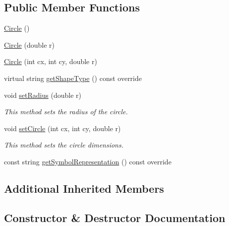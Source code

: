 \subsection*{Public Member Functions}
\begin{DoxyCompactItemize}
\item 
\hyperlink{classbridges_1_1datastructure_1_1_circle_a2106fef85f001fbd2de2d9870a432ef8}{Circle} ()
\item 
\hyperlink{classbridges_1_1datastructure_1_1_circle_a9b814f207d8753ce943b667088963612}{Circle} (double r)
\item 
\hyperlink{classbridges_1_1datastructure_1_1_circle_acb70c092269aa77bbf1afdbdd56234fe}{Circle} (int cx, int cy, double r)
\item 
virtual string \hyperlink{classbridges_1_1datastructure_1_1_circle_aa865c28869b28bbf6416e5a36b7f5102}{get\+Shape\+Type} () const override
\item 
void \hyperlink{classbridges_1_1datastructure_1_1_circle_a23f83969aa4f6965f1392fd90a57894b}{set\+Radius} (double r)
\begin{DoxyCompactList}\small\item\em This method sets the radius of the circle. \end{DoxyCompactList}\item 
void \hyperlink{classbridges_1_1datastructure_1_1_circle_a104b40774cf3bef0ad92d2cf192e2d3a}{set\+Circle} (int cx, int cy, double r)
\begin{DoxyCompactList}\small\item\em This method sets the circle dimensions. \end{DoxyCompactList}\item 
const string \hyperlink{classbridges_1_1datastructure_1_1_circle_a5b896b2aba1fd468f9ddb3aa3b719fe9}{get\+Symbol\+Representation} () const override
\end{DoxyCompactItemize}
\subsection*{Additional Inherited Members}


\subsection{Constructor \& Destructor Documentation}
\mbox{\label{classbridges_1_1datastructure_1_1_circle_a2106fef85f001fbd2de2d9870a432ef8}} 
